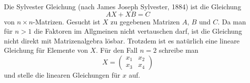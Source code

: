 Die Sylvester Gleichung (nach James Joseph Sylvester, 1884) ist die
Gleichung
\begin{equation}
AX+XB=C
\label{10000040:sylvester}
\end{equation}
von $n\times n$-Matrizen.
Gesucht ist $X$ zu gegebenen Matrizen $A$, $B$ und $C$.
Da man für $n>1$ die Faktoren im Allgmeinen nicht vertauschen darf,
ist die Gleichung nicht direkt mit Matrizenalgebra lösbar.
Trotzdem ist es natürlich eine lineare Gleichung für Elemente von $X$.
Für den Fall $n=2$ schreibe man
\begin{equation}
X=\begin{pmatrix}
x_1&x_2\\
x_3&x_4
\end{pmatrix}
\label{10000040:sylvester2}
\end{equation}
und stelle die linearen Gleichungen für $x$ auf.


